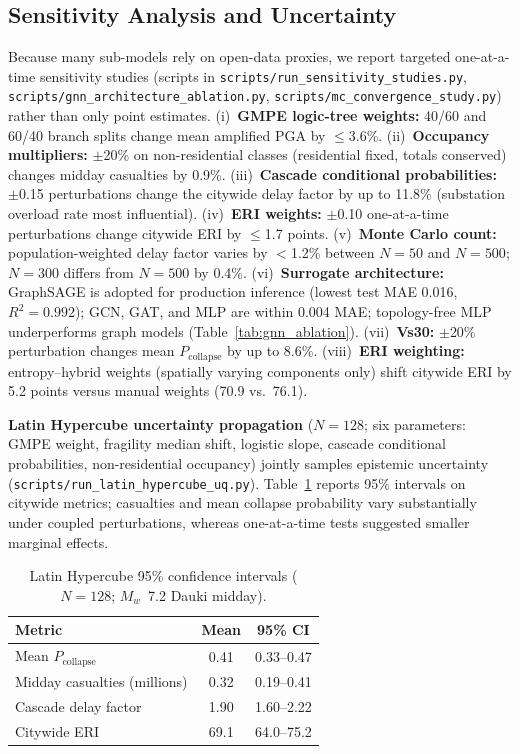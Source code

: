 \documentclass[a4paper,fleqn]{cas-sc}
\begin{document}
\subsection{Sensitivity Analysis and Uncertainty}
\label{sec:sensitivity}
Because many sub-models rely on open-data proxies, we report targeted
one-at-a-time sensitivity studies (scripts in \texttt{scripts/run\_sensitivity\_studies.py},
\texttt{scripts/gnn\_architecture\_ablation.py},
\texttt{scripts/mc\_convergence\_study.py}) rather than only point estimates.
(i)~\textbf{GMPE logic-tree weights:} 40/60 and 60/40 branch splits change
mean amplified PGA by $\leq$3.6\%. (ii)~\textbf{Occupancy multipliers:}
$\pm$20\% on non-residential classes (residential fixed, totals conserved)
changes midday casualties by 0.9\%. (iii)~\textbf{Cascade conditional
probabilities:} $\pm$0.15 perturbations change the citywide delay factor by
up to 11.8\% (substation overload rate most influential). (iv)~\textbf{ERI
weights:} $\pm$0.10 one-at-a-time perturbations change citywide ERI by
$\leq$1.7 points. (v)~\textbf{Monte Carlo count:} population-weighted delay
factor varies by $<$1.2\% between $N = 50$ and $N = 500$; $N = 300$ differs
from $N = 500$ by 0.4\%. (vi)~\textbf{Surrogate architecture:} GraphSAGE is
adopted for production inference (lowest test MAE 0.016, $R^2 = 0.992$); GCN,
GAT, and MLP are within 0.004 MAE; topology-free MLP underperforms graph models
(Table~\ref{tab:gnn_ablation}). (vii)~\textbf{Vs30:} $\pm$20\% perturbation
changes mean $P_{\mathrm{collapse}}$ by up to 8.6\%. (viii)~\textbf{ERI
weighting:} entropy--hybrid weights (spatially varying components only) shift
citywide ERI by 5.2 points versus manual weights (70.9 vs.\ 76.1).

\textbf{Latin Hypercube uncertainty propagation} ($N = 128$; six parameters:
GMPE weight, fragility median shift, logistic slope, cascade conditional
probabilities, non-residential occupancy) jointly samples epistemic uncertainty
(\texttt{scripts/run\_latin\_hypercube\_uq.py}). Table~\ref{tab:uq_ci}
reports 95\% intervals on citywide metrics; casualties and mean collapse
probability vary substantially under coupled perturbations, whereas
one-at-a-time tests suggested smaller marginal effects.

\begin{table}[pos=htbp]
  \centering
  \caption{Latin Hypercube 95\% confidence intervals ($N = 128$; $M_w$~7.2 Dauki midday).}
  \label{tab:uq_ci}
  \small
  \setlength{\tabcolsep}{3pt}
  \begin{tabular}{lcc}
    \toprule
    Metric & Mean & 95\% CI \\
    \midrule
    Mean $P_{\mathrm{collapse}}$ & 0.41 & 0.33--0.47 \\
    Midday casualties (millions) & 0.32 & 0.19--0.41 \\
    Cascade delay factor & 1.90 & 1.60--2.22 \\
    Citywide ERI & 69.1 & 64.0--75.2 \\
    \bottomrule
  \end{tabular}
\end{table}
\end{document}

